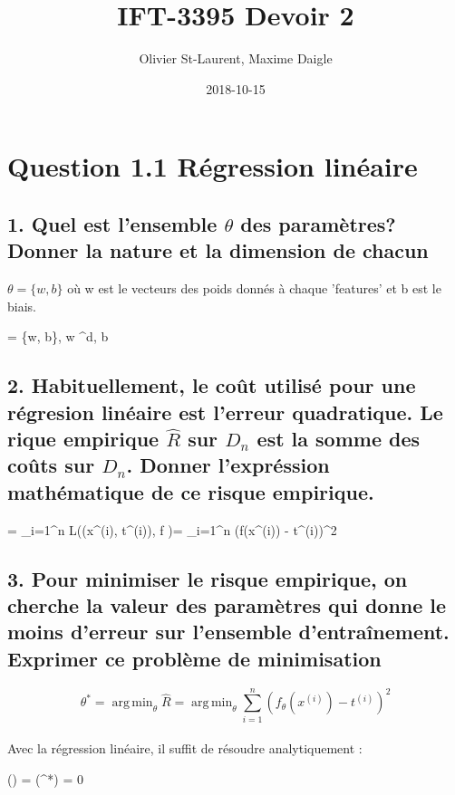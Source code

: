 \documentclass[12pt]{article}
\author{Olivier St-Laurent, Maxime Daigle}
\title{IFT-3395  Devoir 2}
\date{2018-10-15}
\DeclareMathOperator*{\argmin}{arg\,min}
\newenvironment{eqs*}{\begin{equation*}\begin{aligned}}{\end{aligned}\end{equation*}}
\begin{document}
\maketitle

\section{Question 1.1 Régression linéaire}

\subsection{1. Quel est l'ensemble $\theta$ des paramètres? Donner la nature et la dimension de chacun}

	$\theta = \{ w, b\}$ où w est le vecteurs des poids donnés à chaque 'features' et b est le biais. 
	\begin{eqs*}
		\theta = \{w, b\}, w \in {}^{d}, b \in {}
	\end{eqs*}

\subsection{2. Habituellement, le coût utilisé pour une régresion linéaire est l'erreur quadratique. Le rique empirique $\hat{R}$ sur $D_{n}$ est la somme
des coûts sur $D_{n}$. Donner l'expréssion mathématique de ce risque empirique.}
	
	\begin{eqs*}	
		 = \sum_{i=1}^{n} L((x^{(i)}, t^{(i)}), f )= \sum_{i=1}^{n} (f(x^{(i)}) - t^{(i)})^{2}
	\end{eqs*}

\subsection{3. Pour minimiser le risque empirique, on cherche la valeur des paramètres qui donne le moins d'erreur sur l'ensemble d'entraînement.
Exprimer ce problème de minimisation}

	\[\theta^{*} = \argmin_{\theta} \hat{R} = \argmin_{\theta} \sum_{i=1}^{n} (f_{\theta}(x^{(i)}) - t^{(i)})^{2}\] \\
	Avec la régression linéaire, il suffit de résoudre analytiquement :	
	\begin{eqs*}	
		\nabla {}(\theta) = (\theta^{*}) = 0
	\end{eqs*}
\end{document}
